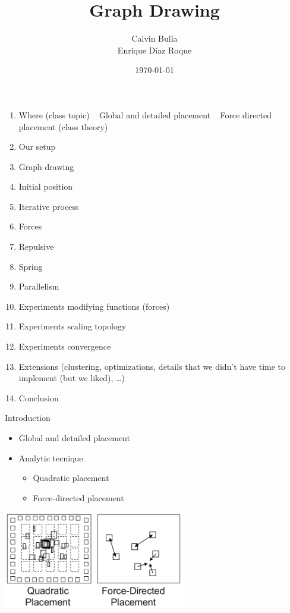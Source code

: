 \documentclass{beamer}
\title{Graph Drawing}
\date{\today}
\author{Calvin Bulla \\ Enrique Díaz Roque}
\institute{Algorithms for VSLI}
\begin{document}
\maketitle

\begin{frame}
\begin {enumerate}
\item Where (class topic) ~ Global and detailed placement ~ Force directed placement (class theory)
\item Our setup
\item Graph drawing
\item Initial position
\item Iterative process
\item Forces
\item Repulsive
\item Spring
\item Parallelism
\item Experiments modifying functions (forces)
\item Experiments scaling topology
\item Experiments convergence
\item Extensions (clustering, optimizations, details that we didn’t have time to implement (but we liked), …)
\item Conclusion
\end{enumerate}
\end{frame}

\begin{frame}{Introduction}
\begin{itemize}
\item Global and detailed placement
\item Analytic tecnique
\begin{itemize}
\item Quadratic placement
\item Force-directed placement
\end{itemize}
\end{itemize}

\centering
\includegraphics[width=0.6\textwidth]{images/placement.png}

\end{frame}
\end{document}
